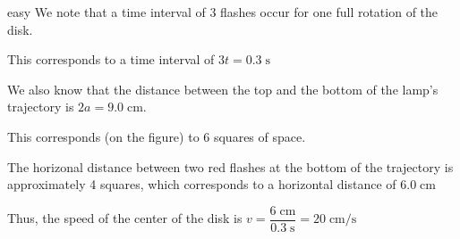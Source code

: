 \begin{solution}{easy}
We note that a time interval of 3 flashes occur for one full rotation of the disk.
\vspace{3mm}

This corresponds to a time interval of $3t=0.3\;\text{s}$ \vspace{3mm}

We also know that the distance between the top and the bottom of the lamp's trajectory is $2a=9.0\;\text{cm}$.\vspace{3mm}

This corresponds (on the figure) to 6 squares of space.\vspace{3mm}

The horizonal distance between two red flashes at the bottom of the trajectory is approximately 4 squares, which corresponds to a horizontal distance of $6.0\;\text{cm}$\vspace{3mm}

Thus, the speed of the center of the disk is $v=\dfrac{6\;\text{cm}}{0.3\;\text{s}}=\boxed{20\;\text{cm/s}}$
\end{solution}